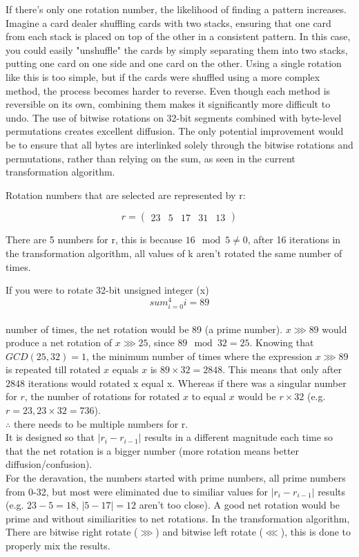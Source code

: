 \documentclass[fleqn, a4paper,12pt]{article}
\begin{document}
If there's only one rotation number, the likelihood of finding a pattern increases. Imagine a card dealer shuffling cards with two stacks, ensuring that one card from each stack is placed on top of the other in a consistent pattern. In this case, you could easily "unshuffle" the cards by simply separating them into two stacks, putting one card on one side and one card on the other. Using a single rotation like this is too simple, but if the cards were shuffled using a more complex method, the process becomes harder to reverse. Even though each method is reversible on its own, combining them makes it significantly more difficult to undo. The use of bitwise rotations on 32-bit segments combined with byte-level permutations creates excellent diffusion. The only potential improvement would be to ensure that all bytes are interlinked solely through the bitwise rotations and permutations, rather than relying on the sum, as seen in the current transformation algorithm.

Rotation numbers that are selected are represented by r:

\[
r = 
\begin{pmatrix}
		23 & 5 & 17 & 31 & 13
\end{pmatrix}
\]

There are 5 numbers for r, this is because $16 \mod 5 \neq 0$, after 16 iterations in the transformation algorithm, all values of k aren't rotated the same number of times.

If you were to rotate 32-bit unsigned integer (x)
\[
sum_{i=0}^4 i = 89
\]
\\
number of times, the net rotation would be 89 (a prime number). $x \ggg 89$ would produce a net rotation of $x \ggg 25$, since $89 \mod 32=25$. Knowing that $GCD(25, 32) = 1$, the minimum number of times where the expression $x \ggg 89$ is repeated till rotated $x$ equals $x$ is $89 \times 32 = 2848$. This means that only after $2848$ iterations would rotated x equal x. Whereas if there was a singular number for $r$, the number of rotations for rotated $x$ to equal $x$ would be $r \times 32$ (e.g. $r=23, 23 \times 32 = 736$). \\

$\therefore$ there needs to be multiple numbers for r.
\\
It is designed so that $|r_i - r_{i-1}|$ results in a different magnitude each time so that the net rotation is a bigger number (more rotation means better diffusion/confusion).
\\
For the deravation, the numbers started with prime numbers, all prime numbers from 0-32, but most were eliminated due to similiar values for  $|r_i - r_{i-1}|$ results (e.g. $23-5=18$, $|5-17|=12$ aren't too close). A good net rotation would be prime and without similiarities to net rotations. In the transformation algorithm, There are bitwise right rotate ($\ggg$) and bitwise left rotate ($\lll$), this is done to properly mix the results.
\end{document}
